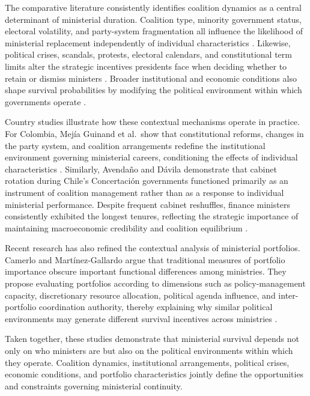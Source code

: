 \documentclass[doc, 12pt, a4paper,floatsintext]{apa7}
\begin{document}
The comparative literature consistently identifies coalition dynamics as a central determinant of ministerial duration. Coalition type, minority government status, electoral volatility, and party-system fragmentation all influence the likelihood of ministerial replacement independently of individual characteristics \parencite{huber_replacing_2008}. Likewise, political crises, scandals, protests, electoral calendars, and constitutional term limits alter the strategic incentives presidents face when deciding whether to retain or dismiss ministers \parencite{camerlo_minister_2015}. Broader institutional and economic conditions also shape survival probabilities by modifying the political environment within which governments operate \parencite{feliu_ribeiro_foreign_2023}.

Country studies illustrate how these contextual mechanisms operate in practice. For Colombia, Mejía Guinand et al.\ show that constitutional reforms, changes in the party system, and coalition arrangements redefine the institutional environment governing ministerial careers, conditioning the effects of individual characteristics \parencite{mejia_es_2021}. Similarly, Avendaño and Dávila demonstrate that cabinet rotation during Chile's Concertación governments functioned primarily as an instrument of coalition management rather than as a response to individual ministerial performance. Despite frequent cabinet reshuffles, finance ministers consistently exhibited the longest tenures, reflecting the strategic importance of maintaining macroeconomic credibility and coalition equilibrium \parencite{avendano_rotacion_2012}.

Recent research has also refined the contextual analysis of ministerial portfolios. Camerlo and Martínez-Gallardo argue that traditional measures of portfolio importance obscure important functional differences among ministries. They propose evaluating portfolios according to dimensions such as policy-management capacity, discretionary resource allocation, political agenda influence, and inter-portfolio coordination authority, thereby explaining why similar political environments may generate different survival incentives across ministries \parencite{camerlo_por_2022}.

Taken together, these studies demonstrate that ministerial survival depends not only on who ministers are but also on the political environments within which they operate. Coalition dynamics, institutional arrangements, political crises, economic conditions, and portfolio characteristics jointly define the opportunities and constraints governing ministerial continuity.
\end{document}
